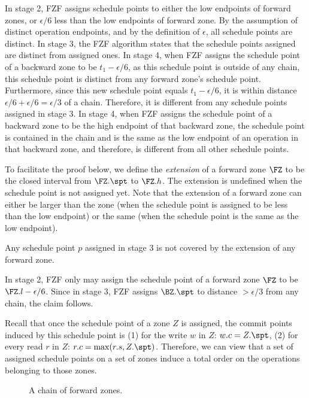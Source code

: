 {\proof In stage 2, FZF assigns schedule points to either the low
endpoints of forward zones, or $\epsilon/6$ less than the low
endpoints of forward zone.  By the assumption of distinct operation
endpoints, and by the definition of $\epsilon$, all schedule points
are distinct.  In stage 3, the FZF algorithm states that the schedule
points assigned are distinct from assigned ones.  In stage 4, when FZF
assigns the schedule point of a backward zone to be $t_1 -
\epsilon/6$, as this schedule point is outside of any chain, this
schedule point is distinct from any forward zone's schedule point.
Furthermore, since this new schedule point equals $t_1 - \epsilon/6$,
it is within distance $\epsilon/6 + \epsilon/6 = \epsilon/3$ of a
chain.  Therefore, it is different from any schedule points assigned
in stage 3.  In stage 4, when FZF assigns the schedule point of a
backward zone to be the high endpoint of that backward zone, the
schedule point is contained in the chain and is the same as the low
endpoint of an operation in that backward zone, and therefore, is
different from all other schedule points.  \QED

To facilitate the proof below, we define the \emph{extension} of a
forward zone $\FZ$ to be the closed interval from $\FZ.\spt$ to
$\FZ.h$.  The extension is undefined when the schedule point is not
assigned yet.  Note that the extension of a forward zone can either be
larger than the zone (when the schedule point is assigned to be less
than the low endpoint) or the same (when the schedule point is the
same as the low endpoint).

\begin{lemma}
  \label{lemma:bz-spt-uncovered}
  Any schedule point $p$ assigned in stage 3 is not covered by the
  extension of any forward zone.
\end{lemma}

\proof In stage 2, FZF only may assign the schedule point of a forward
zone $\FZ$ to be $\FZ.l-\epsilon/6$.  Since in stage 3, FZF assigns
$\BZ.\spt$ to distance $> \epsilon/3$ from any chain, the claim
follows.  \QED

Recall that once the schedule point of a zone $Z$ is assigned, the
commit points induced by this schedule point is (1) for the write $w$
in $Z$: $w.c = Z.\spt$, (2) for every read $r$ in $Z$: $r.c =
\max(r.s, Z.\spt)$.  Therefore, we can view that a set of assigned
schedule points on a set of zones induce a total order on the
operations belonging to those zones.

\begin{figure}[tbp]
  \caption{A chain of forward zones.}
  \label{fig:chain}
\end{figure}

}
